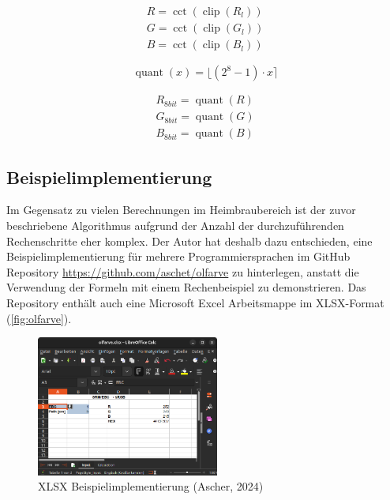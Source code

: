 \documentclass[10pt,a4paper,DIV=12,parskip=half]{scrarticle}
\begin{document}
\begin{equation*}
\begin{gathered}
R = \operatorname{cct}(\operatorname{clip}(R_{l})) \\
G = \operatorname{cct}(\operatorname{clip}(G_{l})) \\
B = \operatorname{cct}(\operatorname{clip}(B_{l}))
\end{gathered}
\end{equation*}

\begin{equation*}
\operatorname{quant}(x) = \lfloor (2^8-1) \cdot x \rceil
\end{equation*}

\begin{equation*}
\begin{gathered}
R_{8bit} = \operatorname{quant}(R) \\
G_{8bit} = \operatorname{quant}(G) \\
B_{8bit} = \operatorname{quant}(B)
\end{gathered}
\end{equation*}

\subsection*{Beispielimplementierung}

Im Gegensatz zu vielen Berechnungen im Heimbraubereich ist der zuvor beschriebene Algorithmus aufgrund der Anzahl der durchzuführenden Rechenschritte eher komplex. Der Autor hat deshalb dazu entschieden, eine Beispielimplementierung für mehrere Programmiersprachen im GitHub Repository \url{https://github.com/aschet/olfarve} zu hinterlegen, anstatt die Verwendung der Formeln mit einem Rechenbeispiel zu demonstrieren. Das Repository enthält auch eine Microsoft Excel Arbeitsmappe im XLSX-Format (\autoref{fig:olfarve}).

\begin{figure}[H]
	\centering
	\includegraphics[width=6cm]{olfarve.png}
	\caption{XLSX Beispielimplementierung (Ascher, 2024)}
	\label{fig:olfarve}
\end{figure}
\end{document}
